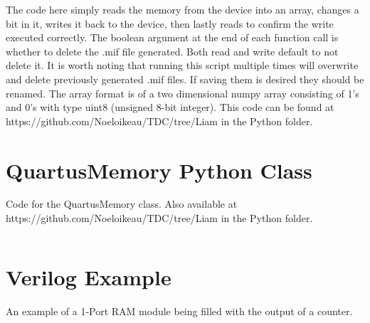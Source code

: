 \documentclass[letter,12pt]{article}
\begin{document}
\begin{mdframed}
\inputminted[linenos=true,breaklines,breakanywhere=true]{python}{../../Python/memoryExample.py}
\end{mdframed}

The code here simply reads the memory from the device into an array, changes a bit in it, writes it back to the device, then lastly reads to confirm the write executed correctly. The boolean argument at the end of each function call is whether to delete the .mif file generated. Both read and write default to not delete it. It is worth noting that running this script multiple times will overwrite and delete previously generated .mif files. If saving them is desired they should be renamed. The array format is of a two dimensional numpy array consisting of 1's and 0's with type uint8 (unsigned 8-bit integer). This code can be found at https://github.com/Noeloikeau/TDC/tree/Liam in the Python folder.

\newpage
\appendix

\section{QuartusMemory Python Class}

Code for the QuartusMemory class. Also available at \\ https://github.com/Noeloikeau/TDC/tree/Liam in the Python folder.

\begin{mdframed}
\inputminted[linenos=true,breaklines,breakanywhere=true]{python}{../../Python/QuartusMemory.py}
\end{mdframed}

\section{Verilog Example}
An example of a 1-Port RAM module being filled with the output of a counter.

\begin{mdframed}
\inputminted[linenos=true,breaklines,breakanywhere=true]{verilog}{memExample.v}
\end{mdframed}
\end{document}
